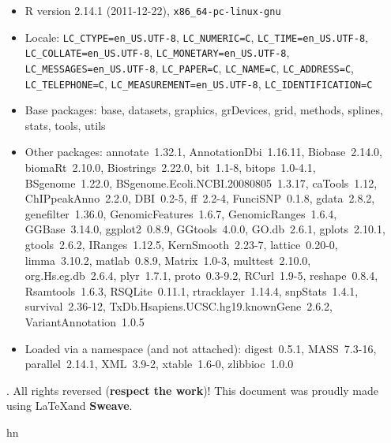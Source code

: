 \documentclass[12pt,fullpage]{article}
\begin{document}
\begin{itemize}\raggedright
  \item R version 2.14.1 (2011-12-22), \verb|x86_64-pc-linux-gnu|
  \item Locale: \verb|LC_CTYPE=en_US.UTF-8|, \verb|LC_NUMERIC=C|, \verb|LC_TIME=en_US.UTF-8|, \verb|LC_COLLATE=en_US.UTF-8|, \verb|LC_MONETARY=en_US.UTF-8|, \verb|LC_MESSAGES=en_US.UTF-8|, \verb|LC_PAPER=C|, \verb|LC_NAME=C|, \verb|LC_ADDRESS=C|, \verb|LC_TELEPHONE=C|, \verb|LC_MEASUREMENT=en_US.UTF-8|, \verb|LC_IDENTIFICATION=C|
  \item Base packages: base, datasets, graphics, grDevices, grid,
    methods, splines, stats, tools, utils
  \item Other packages: annotate~1.32.1, AnnotationDbi~1.16.11,
    Biobase~2.14.0, biomaRt~2.10.0, Biostrings~2.22.0, bit~1.1-8,
    bitops~1.0-4.1, BSgenome~1.22.0,
    BSgenome.Ecoli.NCBI.20080805~1.3.17, caTools~1.12,
    ChIPpeakAnno~2.2.0, DBI~0.2-5, ff~2.2-4, FunciSNP~0.1.8,
    gdata~2.8.2, genefilter~1.36.0, GenomicFeatures~1.6.7,
    GenomicRanges~1.6.4, GGBase~3.14.0, ggplot2~0.8.9, GGtools~4.0.0,
    GO.db~2.6.1, gplots~2.10.1, gtools~2.6.2, IRanges~1.12.5,
    KernSmooth~2.23-7, lattice~0.20-0, limma~3.10.2, matlab~0.8.9,
    Matrix~1.0-3, multtest~2.10.0, org.Hs.eg.db~2.6.4, plyr~1.7.1,
    proto~0.3-9.2, RCurl~1.9-5, reshape~0.8.4, Rsamtools~1.6.3,
    RSQLite~0.11.1, rtracklayer~1.14.4, snpStats~1.4.1,
    survival~2.36-12, TxDb.Hsapiens.UCSC.hg19.knownGene~2.6.2,
    VariantAnnotation~1.0.5
  \item Loaded via a namespace (and not attached): digest~0.5.1,
    MASS~7.3-16, parallel~2.14.1, XML~3.9-2, xtable~1.6-0,
    zlibbioc~1.0.0
\end{itemize}
. All rights reversed (\textbf{respect the work})! This
document was proudly made using \LaTeX and \textbf{Sweave}.

hn
\end{document}
